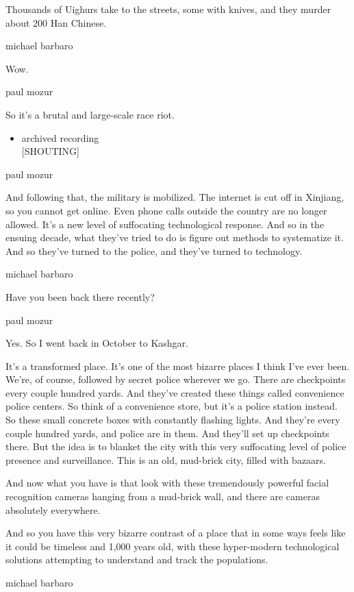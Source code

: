 Thousands of Uighurs take to the streets, some with knives, and they
murder about 200 Han Chinese.

michael barbaro

Wow.

paul mozur

So it's a brutal and large-scale race riot.

\begin{itemize}
\tightlist
\item
  archived recording\\
  {[}SHOUTING{]}
\end{itemize}

paul mozur

And following that, the military is mobilized. The internet is cut off
in Xinjiang, so you cannot get online. Even phone calls outside the
country are no longer allowed. It's a new level of suffocating
technological response. And so in the ensuing decade, what they've tried
to do is figure out methods to systematize it. And so they've turned to
the police, and they've turned to technology.

michael barbaro

Have you been back there recently?

paul mozur

Yes. So I went back in October to Kashgar.

It's a transformed place. It's one of the most bizarre places I think
I've ever been. We're, of course, followed by secret police wherever we
go. There are checkpoints every couple hundred yards. And they've
created these things called convenience police centers. So think of a
convenience store, but it's a police station instead. So these small
concrete boxes with constantly flashing lights. And they're every couple
hundred yards, and police are in them. And they'll set up checkpoints
there. But the idea is to blanket the city with this very suffocating
level of police presence and surveillance. This is an old, mud-brick
city, filled with bazaars.

And now what you have is that look with these tremendously powerful
facial recognition cameras hanging from a mud-brick wall, and there are
cameras absolutely everywhere.

And so you have this very bizarre contrast of a place that in some ways
feels like it could be timeless and 1,000 years old, with these
hyper-modern technological solutions attempting to understand and track
the populations.

michael barbaro

